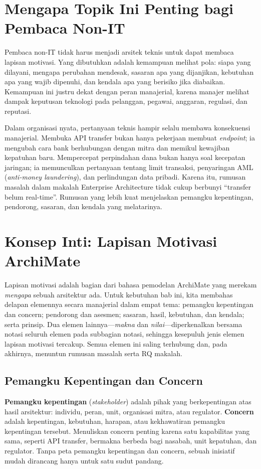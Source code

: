 \section{Mengapa Topik Ini Penting bagi Pembaca Non-IT}

Pembaca non-IT tidak harus menjadi arsitek teknis untuk dapat membaca lapisan
motivasi. Yang dibutuhkan adalah kemampuan melihat pola: siapa yang dilayani,
mengapa perubahan mendesak, sasaran apa yang dijanjikan, kebutuhan apa yang
wajib dipenuhi, dan kendala apa yang berisiko jika diabaikan. Kemampuan ini
justru dekat dengan peran manajerial, karena manajer melihat dampak keputusan
teknologi pada pelanggan, pegawai, anggaran, regulasi, dan reputasi.

Dalam organisasi nyata, pertanyaan teknis hampir selalu membawa konsekuensi
manajerial. Membuka API transfer bukan hanya pekerjaan membuat \emph{endpoint};
ia mengubah cara bank berhubungan dengan mitra dan memikul kewajiban kepatuhan
baru. Mempercepat perpindahan dana bukan hanya soal kecepatan jaringan; ia
memunculkan pertanyaan tentang limit transaksi, penyaringan AML
(\emph{anti-money laundering}), dan
perlindungan data pribadi. Karena itu, rumusan masalah dalam makalah Enterprise
Architecture tidak cukup berbunyi ``transfer belum real-time''. Rumusan yang
lebih kuat menjelaskan pemangku kepentingan, pendorong, sasaran, dan kendala
yang melatarinya.

\section{Konsep Inti: Lapisan Motivasi ArchiMate}

Lapisan motivasi adalah bagian dari bahasa pemodelan ArchiMate yang merekam
\emph{mengapa} sebuah arsitektur ada. Untuk kebutuhan bab ini, kita membahas
delapan elemennya secara manajerial dalam empat tema: pemangku kepentingan dan
concern; pendorong dan asesmen; sasaran, hasil, kebutuhan, dan kendala; serta
prinsip. Dua elemen lainnya---\emph{makna} dan \emph{nilai}---diperkenalkan
bersama notasi seluruh elemen pada subbagian notasi, sehingga kesepuluh jenis
elemen lapisan motivasi tercakup. Semua elemen ini saling terhubung dan, pada
akhirnya, menuntun rumusan masalah serta RQ makalah.

\subsection{Pemangku Kepentingan dan Concern}

\textbf{Pemangku kepentingan} (\emph{stakeholder}) adalah pihak yang
berkepentingan atas hasil arsitektur: individu, peran, unit, organisasi mitra,
atau regulator. \textbf{Concern} adalah kepentingan, kebutuhan, harapan, atau
kekhawatiran pemangku kepentingan tersebut. Menuliskan concern penting karena
satu kapabilitas yang sama, seperti API transfer, bermakna berbeda bagi
nasabah, unit kepatuhan, dan regulator. Tanpa peta pemangku kepentingan dan
concern, sebuah inisiatif mudah dirancang hanya untuk satu sudut pandang.

